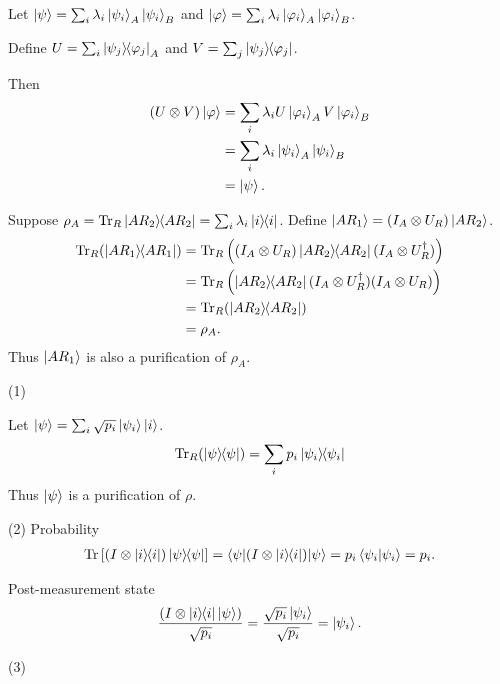 
Let $\ket{\psi} = \sum_i \lambda_i \ket{\psi_i}_A \ket{\psi_i}_B$ and $\ket{\varphi} = \sum_i \lambda_i \ket{\varphi_i}_A \ket{\varphi_i}_B$.

Define $U = \sum_i \ket{\psi_j}\hspace{-1mm} \bra{\varphi_j}_A$ and $V = \sum_j \ket{\psi_j}\hspace{-1mm} \bra{\varphi_j}$.

Then
\begin{align*}
	(U \otimes V) \ket{\varphi} &= \sum_i \lambda_i U \ket{\varphi_i}_A  V \ket{\varphi_i}_B\\
		&= \sum_i \lambda_i \ket{\psi_i}_A \ket{\psi_i}_B\\
		&= \ket{\psi}.
\end{align*}



Suppose $\rho_A = \operatorname{Tr}_R \ket{AR_2}\hspace{-1mm} \bra{AR_2} = \sum_i \lambda_i \ket{i}\hspace{-1mm} \bra{i}$. Define $\ket{AR_1} = (I_A \otimes U_R) \ket{AR_2}$.
\begin{align*}
	\operatorname{Tr}_R (\ket{AR_1}\hspace{-1mm} \bra{AR_1}) &= \operatorname{Tr}_R \left( (I_A \otimes U_R) \ket{AR_2}\hspace{-1mm} \bra{AR_2} (I_A \otimes U_R^\dagger)  \right)\\
		&= \operatorname{Tr}_R \left( \ket{AR_2}\hspace{-1mm} \bra{AR_2} (I_A \otimes U_R^\dagger) (I_A \otimes U_R) \right)\\
		&= \operatorname{Tr}_R ( \ket{AR_2}\hspace{-1mm} \bra{AR_2} )\\
		&= \rho_A.
\end{align*}
Thus $\ket{AR_1}$ is also a purification of $\rho_A$.




(1)

Let $\ket{\psi} = \sum_i \sqrt{p_i} \ket{\psi_i} \ket{i}$.
\begin{align*}
	\operatorname{Tr}_R (\ket{\psi}\hspace{-1mm} \bra{\psi}) = \sum_i p_i \ket{\psi_i}\hspace{-1mm} \bra{\psi_i}
\end{align*}
Thus $\ket{\psi}$ is a purification of $\rho$.

\vspace{5mm}
(2)
Probability
\begin{align*}
	\operatorname{Tr} \left[ (I \otimes \ket{i}\hspace{-1mm} \bra{i}) \ket{\psi}\hspace{-1mm} \bra{\psi}\right] = \braket{\psi | (I \otimes \ket{i}\hspace{-1mm} \bra{i}) | \psi} = p_i \braket{\psi_i | \psi_i} = p_i.
\end{align*}

Post-measurement state
\begin{align*}
	\frac{(I \otimes \ket{i}\hspace{-1mm} \bra{i} \ket{\psi})}{\sqrt{p_i}} = \frac{\sqrt{p_i} \ket{\psi_i}}{\sqrt{p_i}} = \ket{\psi_i}.
\end{align*}


\vspace{5mm}
(3)

